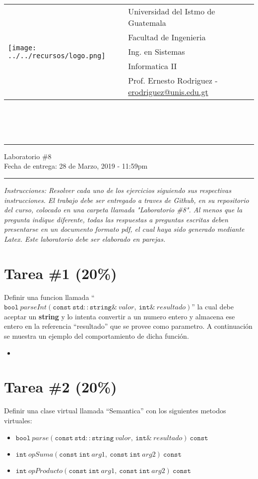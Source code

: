 \documentclass{article}
\newcommand{\horrule}[1]{\rule{\linewidth}{#1}}
\newcommand{\perlscript}[2]{
\begin{itemize}
\item[]
\end{itemize}
}
\begin{document}
\begin{tabular}{l l}
\multirow{5}{*}{\texttt{[image: ../../recursos/logo.png]}} & Universidad del Istmo de Guatemala \\
 & Facultad de Ingenieria \\
 & Ing. en Sistemas \\
 & Informatica II \\
 & Prof. Ernesto Rodriguez - \href{mailto:erodriguez@unis.edu.gt}{erodriguez@unis.edu.gt} \\
\end{tabular}
\\\\\\

\begin{center}
        \horrule{0.5pt}
        \huge{Laboratorio \#8} \\
        \large{Fecha de entrega: 28 de Marzo, 2019 - 11:59pm} \\
        \horrule{1pt}
\end{center}

\emph{Instrucciones: Resolver cada uno de los ejercicios siguiendo sus respectivas
instrucciones. El trabajo debe ser entregado a traves de Github, en su repositorio del curso, colocado en una carpeta llamada "Laboratorio \#8".
Al menos que la pregunta indique diferente, todas las respuestas a preguntas escritas deben presentarse en
un documento formato pdf, el cual haya sido generado mediante Latex. Este laboratorio
debe ser elaborado en parejas.}

\section*{Tarea \#1 (20\%)}

Definir una funcion llamada ``$\mathtt{bool}\ parseInt(\mathtt{const\ std::string\&}\ valor,\ \mathtt{int\&}\ resultado)$'' la
cual debe aceptar un {\bf string} y lo intenta convertir a un numero entero y almacena ese entero en la referencia
``resultado'' que se provee como parametro. A continuaci\'on se muestra un ejemplo del comportamiento
de dicha funci\'on.
\perlscript{parseInt.cc}{Tarea 1}

\section*{Tarea \#2 (20\%)}

Definir una clase virtual llamada ``Semantica'' con los siguientes metodos virtuales:
\begin{itemize}
        \item{$\mathtt{bool}\ parse(\mathtt{const\ std::string}\ valor,\ \mathtt{int\&}\ resultado)\ \mathtt{const}$}
        \item{$\mathtt{int}\ opSuma(\mathtt{const\ int}\ arg1,\ \mathtt{const\ int}\ arg2)\ \mathtt{const}$}
        \item{$\mathtt{int}\ opProducto(\mathtt{const\ int}\ arg1,\ \mathtt{const\ int}\ arg2)\ \mathtt{const}$}
\end{itemize}
\end{document}
